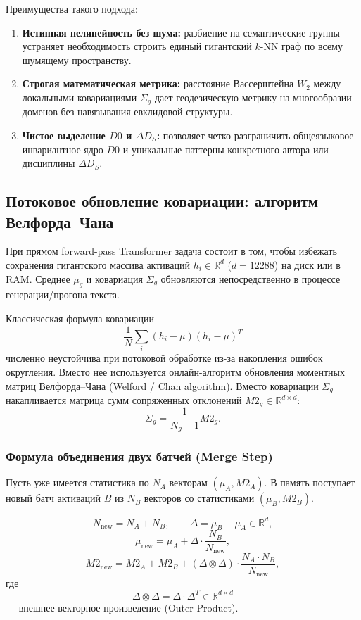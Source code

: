 \documentclass[11pt,a4paper]{article}
\begin{document}
Преимущества такого подхода:
\begin{enumerate}
    \item \textbf{Истинная нелинейность без шума:} разбиение на семантические группы устраняет необходимость строить единый гигантский $k$-NN граф по всему шумящему пространству.
    \item \textbf{Строгая математическая метрика:} расстояние Вассерштейна $W_2$ между локальными ковариациями $\Sigma_g$ дает геодезическую метрику на многообразии доменов без навязывания евклидовой структуры.
    \item \textbf{Чистое выделение $D0$ и $\Delta D_S$:} позволяет четко разграничить общеязыковое инвариантное ядро $D0$ и уникальные паттерны конкретного автора или дисциплины $\Delta D_S$.
\end{enumerate}

\subsection*{Потоковое обновление ковариации: алгоритм Велфорда--Чана}

При прямом forward-pass Transformer задача состоит в том, чтобы избежать сохранения гигантского массива активаций $h_i\in\mathbb{R}^d$ ($d=12288$) на диск или в RAM. Среднее $\mu_g$ и ковариация $\Sigma_g$ обновляются непосредственно в процессе генерации/прогона текста.

Классическая формула ковариации
\[
\frac{1}{N}\sum_i(h_i-\mu)(h_i-\mu)^T
\]
численно неустойчива при потоковой обработке из-за накопления ошибок округления. Вместо нее используется онлайн-алгоритм обновления моментных матриц Велфорда--Чана (Welford / Chan algorithm). Вместо ковариации $\Sigma_g$ накапливается матрица сумм сопряженных отклонений $M2_g\in\mathbb{R}^{d\times d}$:
\[
\Sigma_g=\frac{1}{N_g-1}M2_g.
\]

\subsubsection*{Формула объединения двух батчей (Merge Step)}

Пусть уже имеется статистика по $N_A$ векторам $(\mu_A,M2_A)$. В память поступает новый батч активаций $B$ из $N_B$ векторов со статистиками $(\mu_B,M2_B)$.

\[
N_{\text{new}}=N_A+N_B,
\qquad
\Delta=\mu_B-\mu_A\in\mathbb{R}^d,
\]
\[
\mu_{\text{new}}
=\mu_A+\Delta\cdot\frac{N_B}{N_{\text{new}}},
\]
\[
M2_{\text{new}}
=M2_A+M2_B
+(\Delta\otimes\Delta)\cdot
\frac{N_A\cdot N_B}{N_{\text{new}}},
\]
где
\[
\Delta\otimes\Delta
=\Delta\cdot\Delta^T
\in\mathbb{R}^{d\times d}
\]
— внешнее векторное произведение (Outer Product).
\end{document}
